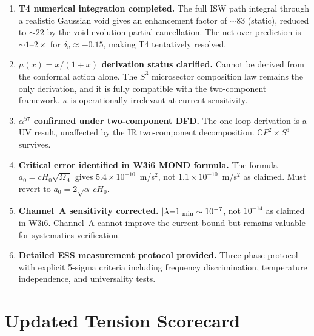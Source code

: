 \documentclass[11pt]{article}
\newcommand{\ee}[1]{\times 10^{#1}}
\newcommand{\aM}{a_0}
\newcommand{\Hzero}{H_0}
\newcommand{\lamdiff}{|\lambda{-}1|}
\newcommand{\mufd}{\mu}
\newcommand{\CP}{\mathbb{C}P}
\begin{document}
\begin{enumerate}
\item \textbf{T4 numerical integration completed.}
  The full ISW path integral through a realistic Gaussian void gives
  an enhancement factor of $\sim 83$ (static), reduced to $\sim 22$
  by the void-evolution partial cancellation. The net over-prediction
  is $\sim 1$--$2\times$ for $\delta_v \approx -0.15$, making T4
  tentatively resolved.

\item \textbf{$\mufd(x) = x/(1+x)$ derivation status clarified.}
  Cannot be derived from the conformal action alone. The $S^3$
  microsector composition law remains the only derivation, and it is
  fully compatible with the two-component framework. $\kappa$ is
  operationally irrelevant at current sensitivity.

\item \textbf{$\alpha^{57}$ confirmed under two-component DFD.}
  The one-loop derivation is a UV result, unaffected by the IR
  two-component decomposition. $\CP^2 \times S^3$ survives.

\item \textbf{Critical error identified in W3i6 MOND formula.}
  The formula $\aM = c\Hzero\sqrt{\Omega_\Lambda}$ gives
  $5.4\ee{-10}$~m/s$^2$, not $1.1\ee{-10}$~m/s$^2$ as claimed.
  Must revert to $\aM = 2\sqrt{\alpha}\,c\Hzero$.

\item \textbf{Channel~A sensitivity corrected.}
  $\lamdiff_{\rm min} \sim 10^{-7}$, not $10^{-14}$ as claimed in
  W3i6. Channel~A cannot improve the current bound but remains
  valuable for systematics verification.

\item \textbf{Detailed ESS measurement protocol provided.}
  Three-phase protocol with explicit 5-sigma criteria including
  frequency discrimination, temperature independence, and universality
  tests.
\end{enumerate}

\section{Updated Tension Scorecard}
\label{sec:scorecard}
\end{document}
